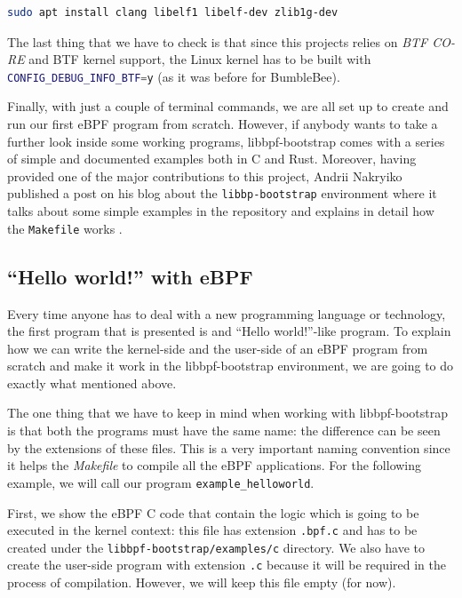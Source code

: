 \begin{lstlisting}[style=commandline, language=bash, caption={libbpf-bootstrap install dependencies command}]
	sudo apt install clang libelf1 libelf-dev zlib1g-dev
\end{lstlisting}

The last thing that we have to check is that since this projects relies on \textit{BTF CO-RE} and BTF kernel support, the  Linux kernel has to be built with \colorbox{backcolour}{\lstinline[style=highlight, language=bash]|CONFIG_DEBUG_INFO_BTF=y|} (as it was before for BumbleBee).

Finally, with just a couple of terminal commands, we are all set up to create and run our first eBPF program from scratch.
However, if anybody wants to take a further look inside some working programs, libbpf-bootstrap comes with a series of simple and documented examples both in C and Rust.
Moreover, having provided one of the major contributions to this project, Andrii Nakryiko published a post on his blog about the \colorbox{backcolour}{\lstinline[style=highlight, language=bash]|libbp-bootstrap|} environment where it talks about some simple examples in the repository and explains in detail how the \colorbox{backcolour}{\lstinline[style=highlight, language=bash]|Makefile|} works \cite{ANlibbpfbootstrap}.

\subsection{``Hello world!'' with eBPF}

Every time anyone has to deal with a new programming language or technology, the first program that is presented is and ``Hello world!''-like program.
To explain how we can write the kernel-side and the user-side of an eBPF program from scratch and make it work in the libbpf-bootstrap environment, we are going to do exactly what mentioned above.

The one thing that we have to keep in mind when working with libbpf-bootstrap is that both the programs must have the same name: the difference can be seen by the extensions of these files.
This is a very important naming convention since it helps the \textit{Makefile} to compile all the eBPF applications.
For the following example, we will call our program \colorbox{backcolour}{\lstinline[style=highlight, language=bash]|example_helloworld|}.

First, we show the eBPF C code that contain the logic which is going to be executed in the kernel context: this file has extension \colorbox{backcolour}{\lstinline[style=highlight, language=bash]|.bpf.c|} and has to be created under the \colorbox{backcolour}{\lstinline[style=highlight, language=bash]|libbpf-bootstrap/examples/c|} directory.
We also have to create the user-side program with extension \colorbox{backcolour}{\lstinline[style=highlight, language=bash]|.c|} because it will be required in the process of compilation.
However, we will keep this file empty (for now).

